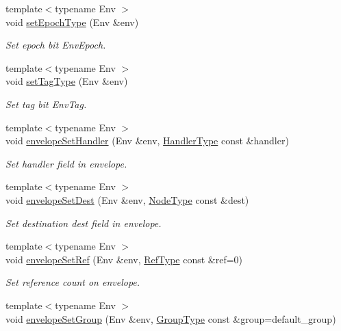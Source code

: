 \begin{DoxyCompactItemize}
{\footnotesize template$<$typename Env $>$ }\\void \hyperlink{namespacevt_afb12c8cb2f8d47e2f06ffa25574f0dd0}{set\+Epoch\+Type} (Env \&env)
\begin{DoxyCompactList}\small\item\em Set epoch bit {\ttfamily Env\+Epoch}. \end{DoxyCompactList}\item 
{\footnotesize template$<$typename Env $>$ }\\void \hyperlink{namespacevt_ad088db89648b82eef7ca9b4837a907cd}{set\+Tag\+Type} (Env \&env)
\begin{DoxyCompactList}\small\item\em Set tag bit {\ttfamily Env\+Tag}. \end{DoxyCompactList}\item 
{\footnotesize template$<$typename Env $>$ }\\void \hyperlink{namespacevt_ac3867aa6df3825cb34320202959434bc}{envelope\+Set\+Handler} (Env \&env, \hyperlink{namespacevt_af64846b57dfcaf104da3ef6967917573}{Handler\+Type} const \&handler)
\begin{DoxyCompactList}\small\item\em Set handler field in envelope. \end{DoxyCompactList}\item 
{\footnotesize template$<$typename Env $>$ }\\void \hyperlink{namespacevt_a78ef1cf108e91a92d83c525fd16fbd4d}{envelope\+Set\+Dest} (Env \&env, \hyperlink{namespacevt_a866da9d0efc19c0a1ce79e9e492f47e2}{Node\+Type} const \&dest)
\begin{DoxyCompactList}\small\item\em Set destination {\ttfamily dest} field in envelope. \end{DoxyCompactList}\item 
{\footnotesize template$<$typename Env $>$ }\\void \hyperlink{namespacevt_a43dd08b8f10d3a1c79872a759aa11662}{envelope\+Set\+Ref} (Env \&env, \hyperlink{namespacevt_a9b39ce9494bb04674d0d5b895a5aa50f}{Ref\+Type} const \&ref=0)
\begin{DoxyCompactList}\small\item\em Set reference count on envelope. \end{DoxyCompactList}\item 
{\footnotesize template$<$typename Env $>$ }\\void \hyperlink{namespacevt_a9f9d4ce6034c0eaaf98bdffd33d0e1c7}{envelope\+Set\+Group} (Env \&env, \hyperlink{namespacevt_a27b5e4411c9b6140c49100e050e2f743}{Group\+Type} const \&group=default\+\_\+group)

\end{DoxyCompactItemize}

